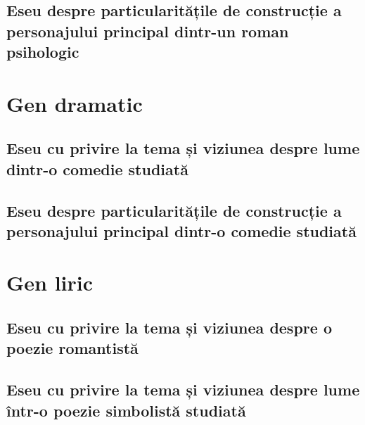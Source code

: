 \documentclass{eseuri_bac_romana}
\begin{document}
\chapter{Eseu despre particularitățile de construcție a personajului principal dintr-un roman psihologic}





\part{Gen dramatic}


\chapter{Eseu cu privire la tema și viziunea despre lume dintr-o comedie studiată}


\chapter{Eseu despre particularitățile de construcție a personajului principal dintr-o comedie studiată}




\part{Gen liric}


\chapter{Eseu cu privire la tema și viziunea despre o poezie romantistă}



\chapter{Eseu cu privire la tema și viziunea despre lume într-o poezie simbolistă studiată}

\end{document}
